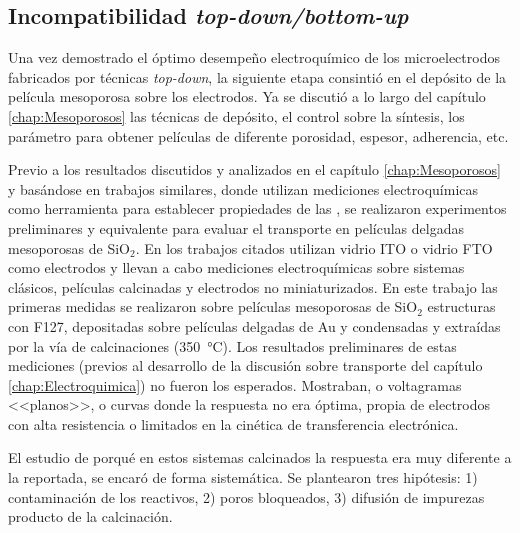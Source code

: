 {{    \subsection{Incompatibilidad \textit{top-down/bottom-up}}

  			Una vez demostrado el óptimo desempeño electroquímico de los microelectrodos fabricados por técnicas \textit{top-down}, la siguiente etapa consintió en el depósito de la película mesoporosa sobre los electrodos. Ya se discutió a lo largo del capítulo \ref{chap:Mesoporosos} las técnicas de depósito, el control sobre la síntesis, los parámetro para obtener películas de diferente porosidad, espesor, adherencia, etc.

  			Previo a los resultados discutidos y analizados en el capítulo \ref{chap:Mesoporosos} y basándose en trabajos similares\cite{Otal2006,Calvo2009,Fattakhova-Rohlfing2007,Rohlfing2005}, donde utilizan mediciones electroquímicas como herramienta para establecer propiedades de las \pdm, se realizaron experimentos preliminares y equivalente para evaluar el transporte en películas delgadas mesoporosas de SiO$_2$. En los trabajos citados utilizan vidrio ITO o vidrio FTO como electrodos y llevan a cabo mediciones electroquímicas sobre sistemas clásicos, películas calcinadas y electrodos no miniaturizados. En este trabajo las primeras medidas se realizaron sobre películas mesoporosas de SiO$_2$ estructuras con F127, depositadas sobre películas delgadas de Au y condensadas y extraídas por la vía de calcinaciones (\SI{350}{\celsius}). Los resultados preliminares de estas mediciones (previos al desarrollo de la discusión sobre transporte del capítulo \ref{chap:Electroquimica}) no fueron los esperados. Mostraban, o voltagramas <<planos>>, o curvas donde la respuesta no era óptima, propia de electrodos con alta resistencia o limitados en la cinética de transferencia electrónica.

  			El estudio de porqué en estos sistemas calcinados la respuesta era muy diferente a la reportada, se encaró de forma sistemática. Se plantearon tres hipótesis: 1) contaminación de los reactivos, 2) poros bloqueados, 3) difusión de impurezas producto de la calcinación.

}}
